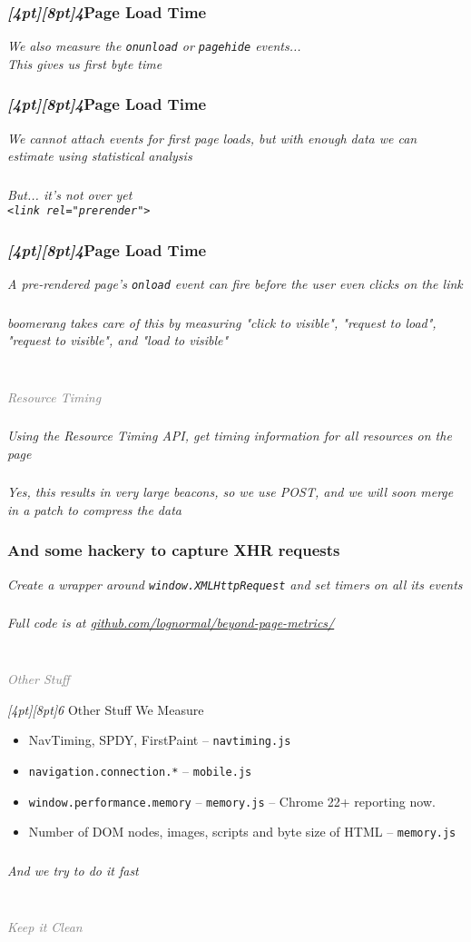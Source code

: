 \documentclass{beamer}
\newcommand{\sn}[1]{\textrm{\textit{\Huge{\raisebox{-3pt}[4pt][8pt]{\textcolor{f2elblue}{#1}}}}}\hspace{4pt}}
\newcommand{\innersplash}[1]{
  \begin{center}
    \large \textrm{\textit{ #1 } }
  \end{center}
}
\newcommand{\splashslide}[2][{}]{
  \begin{frame}
  \frametitle{#1}
  \innersplash{#2}
  \end{frame}
}
\newcommand{\leadinslide}[2]{
  \splashslide{
     {\fontsize{150}{20}\selectfont{\raisebox{0pt}[90pt][0pt]{\textcolor{light-gray}{#1}}}} \\ \huge \textcolor{gray}{#2}
  }
}
\begin{document}
\splashslide[\sn{4}Page Load Time]{We also measure the \texttt{onunload} or \texttt{pagehide} events... \\ This gives us first byte time}

\splashslide[\sn{4}Page Load Time]{We cannot attach events for first page loads, but with enough data we can estimate using statistical analysis}

\splashslide{But... it's not over yet \\ \texttt{<link rel="prerender">}}

\splashslide[\sn{4}Page Load Time]{A pre-rendered page's \texttt{onload} event can fire before the user even clicks on the link}

\splashslide{boomerang takes care of this by measuring "click to visible", "request to load", "request to visible", and "load to visible"}

\leadinslide{5}{Resource Timing}

\splashslide{Using the Resource Timing API, get timing information for all resources on the page}

\splashslide{Yes, this results in very large beacons, so we use POST, and we will soon merge in a patch to compress the data}

\splashslide[And some hackery to capture XHR requests]{Create a wrapper around \texttt{window.XMLHttpRequest} and set timers on all its events}

\splashslide{Full code is at \href{https://github.com/lognormal/beyond-page-metrics/blob/gh-pages/src/instrument-xhr.js}{github.com/lognormal/beyond-page-metrics/}}

\leadinslide{6}{Other Stuff}

\begin{frame}{\sn{6} Other Stuff We Measure}
\begin{itemize}
  \item NavTiming, SPDY, FirstPaint -- \texttt{navtiming.js}
  \item \texttt{navigation.connection.*} -- \texttt{mobile.js}
  \item \texttt{window.performance.memory}  -- \texttt{memory.js} -- Chrome 22+ reporting now.
  \item Number of DOM nodes, images, scripts and byte size of HTML -- \texttt{memory.js}
\end{itemize}
\end{frame}

\splashslide{And we try to do it fast}

\leadinslide{7}{Keep it Clean}
\end{document}
